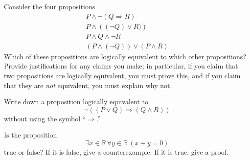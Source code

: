 \documentclass[12pt]{midterm}
\begin{document}
\begin{exam}
\begin{solution}\begin{solutiontext}
\end{solutiontext}\end{solution}

\begin{problem}[360]
  Consider the four propositions
  \begin{eqnarray}
    P \wedge \neg (Q \Rightarrow R) \\
    P \wedge \left( (\neg Q) \vee R) \right) \\
    P \wedge Q \wedge \neg R \\
    \left( P \wedge \left(\neg Q\right) \right) \vee \left(P \wedge R\right) 
  \end{eqnarray}
  Which of these propositions are logically equivalent to which other
  propositions?  Provide justifications for any claims you make; in
  particular, if you claim that two propositions are logically
  equivalent, you must prove this, and if you claim that they are \textit{not} equivalent, you must explain why not.
\end{problem}

\begin{solution}\begin{solutiontext}
\end{solutiontext}\end{solution}

\begin{problem}[360]
  Write down a proposition logically equivalent to
  $$
  \neg \left( \left( P \vee Q \right)  \Rightarrow \left(Q \wedge R\right) \right)
  $$
  without using the symbol ``$\Rightarrow$.''
\end{problem}

\begin{solution}\begin{solutiontext}
\end{solutiontext}\end{solution}

\begin{problem}[360]
  Is the proposition
  $$
  \exists x \in \mathbb{R}\,\forall y \in \mathbb{R}\, (x + y = 0)
  $$
  true or false?  If it is false, give a counterexample.  If it is true, give a proof.
\end{problem}


\end{exam}
\end{document}
